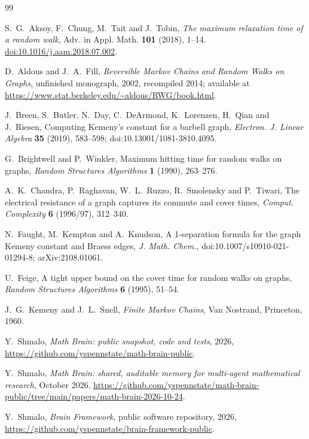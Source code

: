 \documentclass[11pt]{amsart}
\theoremstyle{definition}
\theoremstyle{remark}
\numberwithin{equation}{section}
\begin{document}
\begin{thebibliography}{99}

S.~G.~Aksoy, F.~Chung, M.~Tait and J.~Tobin, \emph{The maximum relaxation time of a random walk}, Adv. in Appl. Math. \textbf{101} (2018), 1--14. \href{https://doi.org/10.1016/j.aam.2018.07.002}{doi:10.1016/j.aam.2018.07.002}.

D.~Aldous and J.~A.~Fill, \emph{Reversible Markov Chains and Random Walks on Graphs}, unfinished monograph, 2002, recompiled 2014; available at \url{https://www.stat.berkeley.edu/~aldous/RWG/book.html}.

J.~Breen, S.~Butler, N.~Day, C.~DeArmond, K.~Lorenzen, H.~Qian and J.~Riesen, Computing Kemeny's constant for a barbell graph, \emph{Electron. J. Linear Algebra} \textbf{35} (2019), 583--598; doi:10.13001/1081-3810.4095.

G.~Brightwell and P.~Winkler, Maximum hitting time for random walks on graphs, \emph{Random Structures Algorithms} \textbf{1} (1990), 263--276.

A.~K.~Chandra, P.~Raghavan, W.~L.~Ruzzo, R.~Smolensky and P.~Tiwari, The electrical resistance of a graph captures its commute and cover times, \emph{Comput. Complexity} \textbf{6} (1996/97), 312--340.

N.~Faught, M.~Kempton and A.~Knudson, A 1-separation formula for the graph Kemeny constant and Braess edges, \emph{J. Math. Chem.}, doi:10.1007/s10910-021-01294-8; arXiv:2108.01061.

U.~Feige, A tight upper bound on the cover time for random walks on graphs, \emph{Random Structures Algorithms} \textbf{6} (1995), 51--54.

J.~G.~Kemeny and J.~L.~Snell, \emph{Finite Markov Chains}, Van Nostrand, Princeton, 1960.

 Y.~Shmalo, \emph{Math Brain: public snapshot, code and tests}, 2026, \url{https://github.com/yspennstate/math-brain-public}.

 Y.~Shmalo, \emph{Math Brain: shared, auditable memory for multi-agent mathematical research}, October 2026, \url{https://github.com/yspennstate/math-brain-public/tree/main/papers/math-brain-2026-10-24}.

 Y.~Shmalo, \emph{Brain Framework}, public software repository, 2026, \url{https://github.com/yspennstate/brain-framework-public}.

\end{thebibliography}
\end{document}
